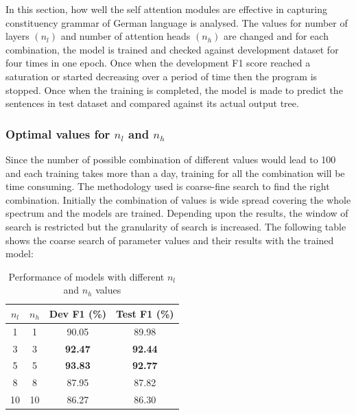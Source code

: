 \documentclass[a4paper, 11pt]{article}
\begin{document}
In this section, how well the self attention modules are effective in capturing constituency grammar of German language is analysed. The values for number of layers $(n_l)$ and number of attention heads $(n_h)$ are changed and for each combination, the model is trained and checked against development dataset for four times in one epoch. Once when the development F1 score reached a saturation or started decreasing over a period of time then the program is stopped. Once when the training is completed, the model is made to predict the sentences in test dataset and compared against its actual output tree. 

\subsubsection{Optimal values for $n_l$ and $n_h$}

Since the number of possible combination of different values would lead to 100 and each training takes more than a day, training for all the combination will be time consuming. The methodology used is coarse-fine search to find the right combination. Initially the combination of values is wide spread covering the whole spectrum and the models are trained. Depending upon the results, the window of search is restricted but the granularity of search is increased. The following table shows the coarse search of parameter values and their results with the trained model:

\begin{table}[h!]
  \begin{center}
    \label{tab:coarse_search_for_layers_heads}
    \def\arraystretch{1.5}%
    \begin{tabular}{c|c|c|c}
      \textbf{$n_l$} & \textbf{$n_h$} & Dev F1 (\%) & Test F1 (\%) \\
      \hline
      1 & 1 & 90.05 & 89.98\\
      3 & 3 & \textbf{92.47} & \textbf{92.44}\\
      5 & 5 & \textbf{93.83} & \textbf{92.77}\\
      8 & 8 & 87.95 & 87.82\\
      10 & 10 & 86.27 & 86.30\\
    \end{tabular}
    \caption{Performance of models with different $n_l$ and $n_h$ values}
  \end{center}
\end{table}
\end{document}

